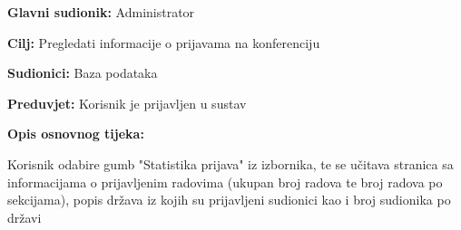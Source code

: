 					\noindent {}
					\begin{packed_item}
	
						\item \textbf{Glavni sudionik: } Administrator
						\item  \textbf{Cilj:} Pregledati informacije o prijavama na konferenciju
						\item  \textbf{Sudionici:} Baza podataka
						\item  \textbf{Preduvjet:} Korisnik je prijavljen u sustav
						\item  \textbf{Opis osnovnog tijeka:}
						
						\item[] \begin{packed_enum}
	
							\item Korisnik odabire gumb "Statistika prijava" iz izbornika, te se učitava stranica sa informacijama o prijavljenim radovima (ukupan broj radova te broj radova po sekcijama), popis država iz kojih su prijavljeni sudionici kao i broj sudionika po državi

						\end{packed_enum}
			
					\end{packed_item}
				
